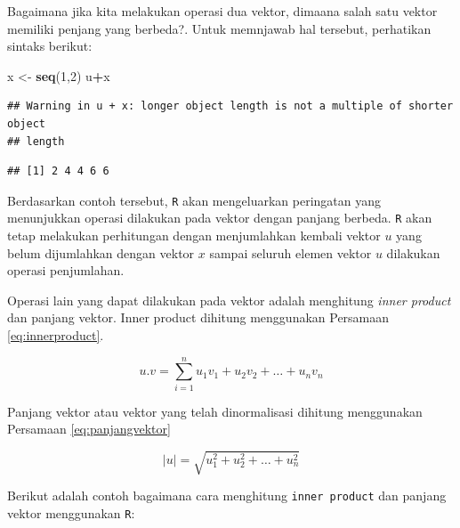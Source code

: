 \documentclass[]{book}
\newenvironment{Shaded}{\begin{snugshade}}{\end{snugshade}}
\newcommand{\CommentTok}[1]{\textcolor[rgb]{0.56,0.35,0.01}{\textit{#1}}}
\newcommand{\DecValTok}[1]{\textcolor[rgb]{0.00,0.00,0.81}{#1}}
\newcommand{\KeywordTok}[1]{\textcolor[rgb]{0.13,0.29,0.53}{\textbf{#1}}}
\newcommand{\NormalTok}[1]{#1}
\newcommand{\OperatorTok}[1]{\textcolor[rgb]{0.81,0.36,0.00}{\textbf{#1}}}
\newcommand{\StringTok}[1]{\textcolor[rgb]{0.31,0.60,0.02}{#1}}
\theoremstyle{definition}
\theoremstyle{definition}
\theoremstyle{definition}
\theoremstyle{remark}
\begin{document}
Bagaimana jika kita melakukan operasi dua vektor, dimaana salah satu vektor memiliki penjang yang berbeda?. Untuk memnjawab hal tersebut, perhatikan sintaks berikut:

\begin{Shaded}
\begin{Highlighting}[]
\NormalTok{x <-}\StringTok{ }\KeywordTok{seq}\NormalTok{(}\DecValTok{1}\NormalTok{,}\DecValTok{2}\NormalTok{)}
\NormalTok{u}\OperatorTok{+}\NormalTok{x}
\end{Highlighting}
\end{Shaded}

\begin{verbatim}
## Warning in u + x: longer object length is not a multiple of shorter object
## length
\end{verbatim}

\begin{verbatim}
## [1] 2 4 4 6 6
\end{verbatim}

Berdasarkan contoh tersebut, \texttt{R} akan mengeluarkan peringatan yang menunjukkan operasi dilakukan pada vektor dengan panjang berbeda. \texttt{R} akan tetap melakukan perhitungan dengan menjumlahkan kembali vektor \(u\) yang belum dijumlahkan dengan vektor \(x\) sampai seluruh elemen vektor \(u\) dilakukan operasi penjumlahan.

Operasi lain yang dapat dilakukan pada vektor adalah menghitung \emph{inner product} dan panjang vektor. Inner product dihitung menggunakan Persamaan \eqref{eq:innerproduct}.

\begin{equation}
u.v=\sum_{i=1}^nu_1v_1+u_2v_2+\dots+u_nv_n
  \label{eq:innerproduct}
\end{equation}

Panjang vektor atau vektor yang telah dinormalisasi dihitung menggunakan Persamaan \eqref{eq:panjangvektor}

\begin{equation}
\left|u\right|=\sqrt{u_1^2+u_2^2+\dots+u_n^2}
  \label{eq:panjangvektor}
\end{equation}

Berikut adalah contoh bagaimana cara menghitung \texttt{inner\ product} dan panjang vektor menggunakan \texttt{R}:

\begin{Shaded}
\end{Shaded}
\end{document}
